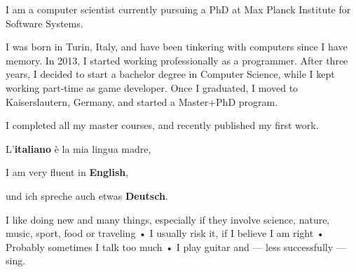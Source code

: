 


I am a computer scientist currently pursuing a PhD at Max Planck Institute for Software Systems. 

I was born in Turin, Italy, and have been tinkering with computers since I have memory. In 2013, I started working professionally as a programmer. After three years, I decided to start a bachelor degree in Computer Science, while I kept working part-time as game developer. Once I graduated, I moved to Kaiserslautern, Germany, and started a Master+PhD program.

I completed all my master courses, and recently published my first work.


L'\textbf{italiano} è la mia lingua madre,

I am very fluent in \textbf{English},

und ich spreche auch etwas \textbf{Deutsch}.


I like doing new and many things, especially if they involve science, nature, music, sport, food or traveling • I usually risk it, if I believe I am right • Probably sometimes I talk too much • I play guitar and --- less successfully --- sing.


